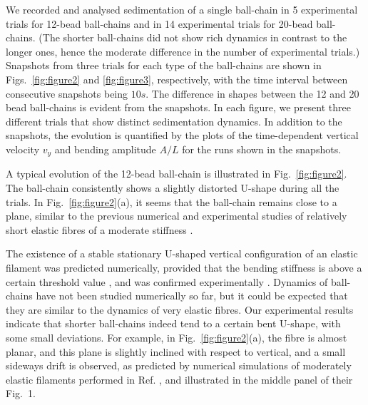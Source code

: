 \documentclass{article}
\begin{document}
We recorded and analysed sedimentation of a single ball-chain in 5 %
experimental trials for 12-bead ball-chains and in 14 %
experimental trials for 20-bead ball-chains. (The shorter ball-chains did not show rich dynamics in contrast to the longer ones, hence the moderate difference in the number of experimental trials.) 
Snapshots from three trials for each type of the ball-chains are shown 
in Figs.~\ref{fig:figure2} and \ref{fig:figure3}, respectively,
with the time interval between consecutive snapshots being $10 s$.
The difference in shapes %
between the 12 and 20 bead ball-chains is evident from the snapshots. In each figure, we present three different trials that show distinct sedimentation dynamics. In addition to the snapshots, the evolution %
is quantified by the plots of the time-dependent vertical velocity $v_y$ and bending amplitude $A/L$ for the runs shown in the snapshots.

A typical evolution of the 12-bead ball-chain is illustrated in %
Fig.~\ref{fig:figure2}. %
The ball-chain consistently shows a slightly %
distorted U-shape during all the trials. %
In Fig.~\ref{fig:figure2}(a), it seems that the ball-chain remains close to %
a plane, similar to the previous numerical %
and experimental %
studies of relatively short elastic %
fibres of a moderate stiffness %
\cite{lagomarsino2005hydrodynamic,schlagberger2005orientation,manghi2006,li2013sedimentation,saggiorato2015conformations,shojaei2015sedimentation,marchetti2018deformation, bukowicki2018different,bukowicki2019sedimenting}. 

The existence of a stable stationary U-shaped vertical configuration of an elastic filament was predicted numerically, provided that the bending stiffness is above a certain threshold value \cite{lagomarsino2005hydrodynamic,li2013sedimentation,saggiorato2015conformations,shojaei2015sedimentation,bukowicki2018different,bukowicki2019sedimenting}, and was confirmed experimentally \cite{marchetti2018deformation}. Dynamics of ball-chains have not been studied numerically so far, but it could be expected that they are similar to the dynamics of very elastic fibres.  %
Our experimental results indicate that shorter ball-chains indeed tend to a certain bent U-shape, with some small deviations.
For example, in Fig.~\ref{fig:figure2}(a), the fibre is almost planar, and this plane is slightly inclined with respect to vertical, and a small sideways drift is observed, as predicted by numerical simulations of moderately elastic filaments performed in Ref. \cite{saggiorato2015conformations}, and illustrated in the middle panel of their Fig.~1. 
\end{document}
